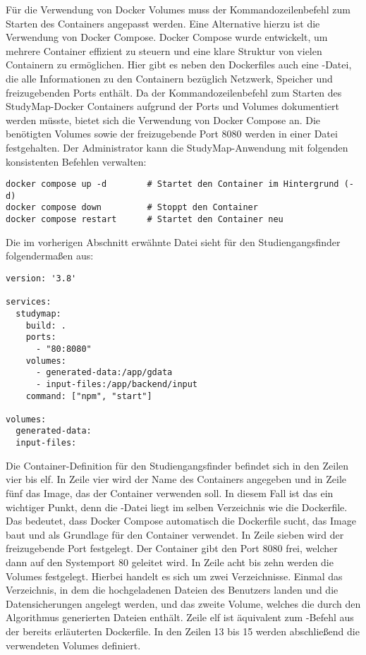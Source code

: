 Für die Verwendung von Docker Volumes muss der Kommandozeilenbefehl zum Starten des Containers angepasst werden. Eine Alternative hierzu ist die Verwendung von Docker Compose. Docker Compose wurde entwickelt, um mehrere Container effizient zu steuern und eine klare Struktur von vielen Containern zu ermöglichen. Hier gibt es neben den Dockerfiles auch eine -Datei, die alle Informationen zu den Containern bezüglich Netzwerk, Speicher und freizugebenden Ports enthält. Da der Kommandozeilenbefehl zum Starten des StudyMap-Docker Containers aufgrund der Ports und Volumes dokumentiert werden müsste, bietet sich die Verwendung von Docker Compose an. Die benötigten Volumes sowie der freizugebende Port 8080 werden in einer Datei festgehalten. \parencite{docker_inc_docker_0000} Der Administrator kann die StudyMap-Anwendung mit folgenden konsistenten Befehlen verwalten:

\noindent
\begin{minipage}{\linewidth}
\begin{lstlisting}[style=Python]
docker compose up -d        # Startet den Container im Hintergrund (-d)
docker compose down         # Stoppt den Container
docker compose restart      # Startet den Container neu
\end{lstlisting}
\end{minipage}

Die im vorherigen Abschnitt erwähnte Datei  sieht für den Studiengangsfinder folgendermaßen aus:
\begin{lstlisting}[style=Python]
version: '3.8'

services:
  studymap:
    build: .
    ports:
      - "80:8080"
    volumes:
      - generated-data:/app/gdata
      - input-files:/app/backend/input
    command: ["npm", "start"]

volumes:
  generated-data:
  input-files:
\end{lstlisting}

Die Container-Definition für den Studiengangsfinder befindet sich in den Zeilen vier bis elf. In Zeile vier wird der Name des Containers angegeben und in Zeile fünf das Image, das der Container verwenden soll. In diesem Fall ist das ein wichtiger Punkt, denn die -Datei liegt im selben Verzeichnis wie die Dockerfile. Das bedeutet, dass Docker Compose automatisch die Dockerfile sucht, das Image baut und als Grundlage für den Container verwendet. In Zeile sieben wird der freizugebende Port festgelegt. Der Container gibt den Port 8080 frei, welcher dann auf den Systemport 80 geleitet wird. In Zeile acht bis zehn werden die Volumes festgelegt. Hierbei handelt es sich um zwei Verzeichnisse. Einmal das Verzeichnis, in dem die hochgeladenen Dateien des Benutzers landen und die Datensicherungen angelegt werden, und das zweite Volume, welches die durch den Algorithmus generierten Dateien enthält. Zeile elf ist äquivalent zum -Befehl aus der bereits erläuterten Dockerfile. In den Zeilen 13 bis 15 werden abschließend die verwendeten Volumes definiert.

